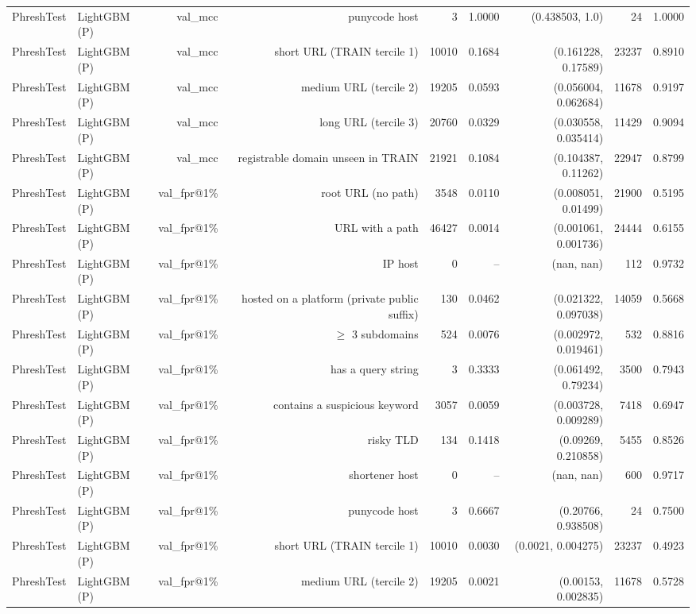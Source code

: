 \begin{table}[t]
\begin{tabular}{llrrrrrrr}
PhreshTest & LightGBM (P) & val\_mcc & punycode host & 3 & 1.0000 & (0.438503, 1.0) & 24 & 1.0000 \\
PhreshTest & LightGBM (P) & val\_mcc & short URL (TRAIN tercile 1) & 10010 & 0.1684 & (0.161228, 0.17589) & 23237 & 0.8910 \\
PhreshTest & LightGBM (P) & val\_mcc & medium URL (tercile 2) & 19205 & 0.0593 & (0.056004, 0.062684) & 11678 & 0.9197 \\
PhreshTest & LightGBM (P) & val\_mcc & long URL (tercile 3) & 20760 & 0.0329 & (0.030558, 0.035414) & 11429 & 0.9094 \\
PhreshTest & LightGBM (P) & val\_mcc & registrable domain unseen in TRAIN & 21921 & 0.1084 & (0.104387, 0.11262) & 22947 & 0.8799 \\
PhreshTest & LightGBM (P) & val\_fpr@1\% & root URL (no path) & 3548 & 0.0110 & (0.008051, 0.01499) & 21900 & 0.5195 \\
PhreshTest & LightGBM (P) & val\_fpr@1\% & URL with a path & 46427 & 0.0014 & (0.001061, 0.001736) & 24444 & 0.6155 \\
PhreshTest & LightGBM (P) & val\_fpr@1\% & IP host & 0 & -- & (nan, nan) & 112 & 0.9732 \\
PhreshTest & LightGBM (P) & val\_fpr@1\% & hosted on a platform (private public suffix) & 130 & 0.0462 & (0.021322, 0.097038) & 14059 & 0.5668 \\
PhreshTest & LightGBM (P) & val\_fpr@1\% & $\geq$ 3 subdomains & 524 & 0.0076 & (0.002972, 0.019461) & 532 & 0.8816 \\
PhreshTest & LightGBM (P) & val\_fpr@1\% & has a query string & 3 & 0.3333 & (0.061492, 0.79234) & 3500 & 0.7943 \\
PhreshTest & LightGBM (P) & val\_fpr@1\% & contains a suspicious keyword & 3057 & 0.0059 & (0.003728, 0.009289) & 7418 & 0.6947 \\
PhreshTest & LightGBM (P) & val\_fpr@1\% & risky TLD & 134 & 0.1418 & (0.09269, 0.210858) & 5455 & 0.8526 \\
PhreshTest & LightGBM (P) & val\_fpr@1\% & shortener host & 0 & -- & (nan, nan) & 600 & 0.9717 \\
PhreshTest & LightGBM (P) & val\_fpr@1\% & punycode host & 3 & 0.6667 & (0.20766, 0.938508) & 24 & 0.7500 \\
PhreshTest & LightGBM (P) & val\_fpr@1\% & short URL (TRAIN tercile 1) & 10010 & 0.0030 & (0.0021, 0.004275) & 23237 & 0.4923 \\
PhreshTest & LightGBM (P) & val\_fpr@1\% & medium URL (tercile 2) & 19205 & 0.0021 & (0.00153, 0.002835) & 11678 & 0.5728 \\

\end{tabular}
\end{table}
